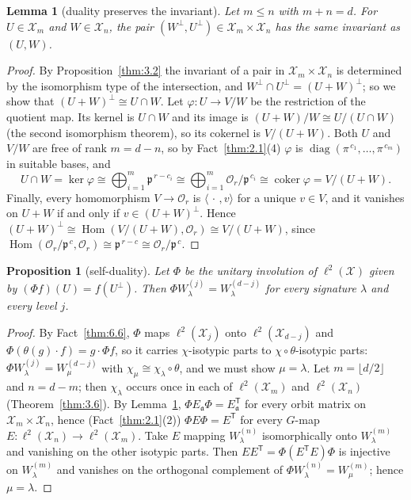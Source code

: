 \documentclass[11pt]{article}
\numberwithin{equation}{section}
\theoremstyle{plain}
\newtheorem{proposition}[theorem]{Proposition}
\newtheorem{lemma}[theorem]{Lemma}
\theoremstyle{definition}
\begin{document}
\begin{lemma}[duality preserves the invariant]\label{thm:6.7}
Let $m\le n$ with $m+n=d$. For $U\in \mathcal{X}_m$ and $W\in \mathcal{X}_n$, the pair
$(W^\perp,U^\perp)\in \mathcal{X}_m\times \mathcal{X}_n$ has the same invariant as $(U,W)$.
\end{lemma}

\begin{proof}
By Proposition~\ref{thm:3.2} the invariant of a pair in $\mathcal{X}_m\times \mathcal{X}_n$ is determined
by the isomorphism type of the intersection, and $W^\perp\cap U^\perp=(U+W)^\perp$; so we
show that $(U+W)^\perp\cong U\cap W$. Let $\varphi\colon U\to V/W$ be the restriction of the
quotient map. Its kernel is $U\cap W$ and its image is $(U+W)/W\cong U/(U\cap W)$ (the second
isomorphism theorem), so its cokernel is $V/(U+W)$. Both $U$ and $V/W$ are free of rank
$m=d-n$, so by Fact~\ref{thm:2.1}(4) $\varphi$ is $\operatorname{diag}(\pi^{\,c_1},\dots,\pi^{\,c_m})$
in suitable bases, and
\[
U\cap W=\ker\varphi\cong\bigoplus_{i=1}^{m}\mathfrak{p}^{\,r-c_i}\cong\bigoplus_{i=1}^{m}\mathcal{O}_r/\mathfrak{p}^{\,c_i}
\cong\operatorname{coker}\varphi=V/(U+W).
\]
Finally, every homomorphism $V\to\mathcal{O}_r$ is $\langle\,\cdot\,,v\rangle$ for a unique $v\in V$,
and it vanishes on $U+W$ if and only if $v\in(U+W)^\perp$. Hence
$(U+W)^\perp\cong\operatorname{Hom}(V/(U+W),\mathcal{O}_r)\cong V/(U+W)$, since
$\operatorname{Hom}(\mathcal{O}_r/\mathfrak{p}^{\,c},\mathcal{O}_r)\cong\mathfrak{p}^{\,r-c}\cong\mathcal{O}_r/\mathfrak{p}^{\,c}$.
\end{proof}

\begin{proposition}[self-duality]\label{thm:6.8}
Let $\Phi$ be the unitary involution of $\ell^2(\mathcal{X})$ given by $(\Phi f)(U)=f(U^\perp)$.
Then $\Phi W^{(j)}_\lambda=W^{(d-j)}_\lambda$ for every signature $\lambda$ and every level $j$.
\end{proposition}

\begin{proof}
By Fact~\ref{thm:6.6}, $\Phi$ maps $\ell^2(\mathcal{X}_j)$ onto $\ell^2(\mathcal{X}_{d-j})$ and
$\Phi(\theta(g)\cdot f)=g\cdot\Phi f$, so it carries $\chi$-isotypic parts to
$\chi\circ\theta$-isotypic parts: $\Phi W^{(j)}_\lambda=W^{(d-j)}_\mu$ with
$\chi_\mu\cong\chi_\lambda\circ\theta$, and we must show $\mu=\lambda$. Let $m=\lfloor d/2\rfloor$ and
$n=d-m$; then $\chi_\lambda$ occurs once in each of $\ell^2(\mathcal{X}_m)$ and $\ell^2(\mathcal{X}_n)$
(Theorem~\ref{thm:3.6}). By Lemma~\ref{thm:6.7}, $\Phi E_{\mathfrak{a}}\Phi=E_{\mathfrak{a}}^{\mathsf T}$
for every orbit matrix on $\mathcal{X}_m\times\mathcal{X}_n$, hence (Fact~\ref{thm:2.1}(2))
$\Phi E\Phi=E^{\mathsf T}$ for every $G$-map $E\colon\ell^2(\mathcal{X}_n)\to\ell^2(\mathcal{X}_m)$.
Take $E$ mapping $W^{(n)}_\lambda$ isomorphically onto $W^{(m)}_\lambda$ and vanishing on the other
isotypic parts. Then $EE^{\mathsf T}=\Phi(E^{\mathsf T}E)\Phi$ is injective on $W^{(m)}_\lambda$ and
vanishes on the orthogonal complement of $\Phi W^{(n)}_\lambda=W^{(m)}_\mu$; hence $\mu=\lambda$.
\end{proof}
\end{document}
